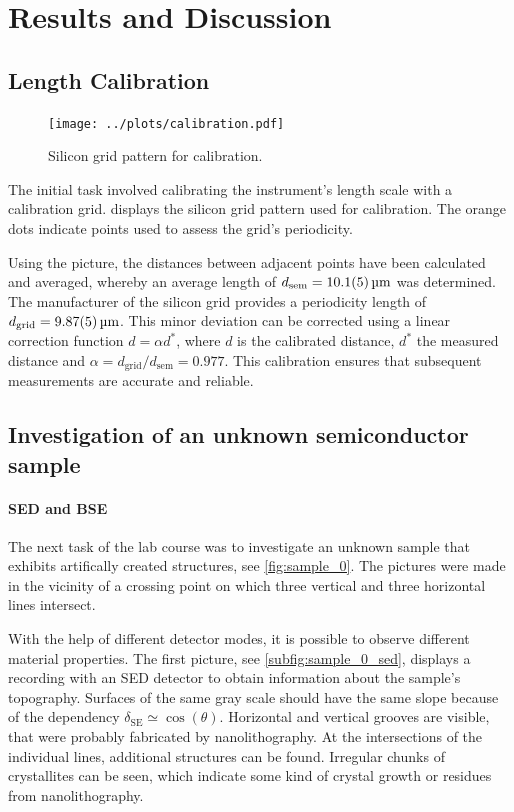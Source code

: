 \section{Results and Discussion}
\subsection{Length Calibration}

\begin{figure}
	\centering
	\texttt{[image: ../plots/calibration.pdf]}
	\caption{Silicon grid pattern for calibration.}
	\label{fig:calibration}
\end{figure}

The initial task involved calibrating the instrument's length scale with a calibration grid.
 displays the silicon grid pattern
used for calibration.
The orange dots indicate points used to assess the grid's periodicity.

Using the picture, the distances between adjacent points have
been calculated and averaged, whereby an average length of
$d_{\mathrm{sem}}=\qty{10.1 \pm 0.5}{\micro\meter}$ was determined.
The manufacturer of the silicon grid provides a periodicity length of
$d_{\mathrm{grid}}=\qty{9.87\pm 0.05}{\micro\meter}$.
This minor deviation can be corrected using a linear
correction function $d = \alpha d^*$, where $d$ is the calibrated
distance, $d^*$ the measured distance and
$\alpha=d_{\mathrm{grid}} /d_{\mathrm{sem}} = \num{0.977}$.
This calibration ensures that subsequent measurements are accurate and
reliable.

\subsection{Investigation of an unknown semiconductor sample}
\paragraph{SED and BSE}
The next task of the lab course was to investigate an unknown sample
that exhibits artifically created structures, see \cref{fig:sample_0}.
The pictures were made in the vicinity of a crossing
point on which three vertical and three horizontal lines intersect.

With the help of different detector modes, it is possible to observe
different material properties.
The first picture, see \cref{subfig:sample_0_sed}, displays a recording
with an SED detector to obtain information about the sample's topography.
Surfaces of the same gray scale should have the same slope because of the
dependency $\delta_\mathrm{SE} \simeq \cos(\theta)$.
Horizontal and vertical grooves are visible, that were probably
fabricated by nanolithography.
At the intersections of the individual lines, additional structures can
be found.
Irregular chunks of crystallites can be seen, which indicate
some kind of crystal growth or residues from nanolithography.

